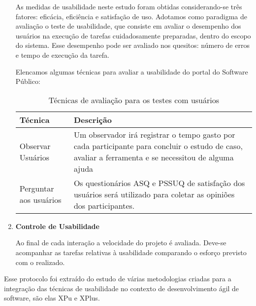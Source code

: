 \begin{enumerate}
	As medidas de usabilidade neste estudo foram obtidas considerando-se três fatores: eficácia, eficiência e satisfação de uso.
	Adotamos como paradigma de avaliação o teste de usabilidade, que consiste em avaliar o desempenho dos usuários na execução de tarefas cuidadosamente preparadas, dentro do escopo do sistema. Esse desempenho pode ser avaliado nos quesitos: número de erros e tempo de execução da tarefa. %

	Elencamos algumas técnicas para avaliar a usabilidade do portal do Software Público:

	\begin{table}[h]
	\begin{tabular}{|l| p{10cm}	|}
		\hline
		Técnica & Descrição \\ \hline
		Observar Usuários & Um observador irá registrar o tempo 
		gasto por cada participante para concluir o estudo de caso, 
		avaliar a ferramenta e se necessitou de alguma ajuda    \\ \hline
		Perguntar aos usuários & Os questionários ASQ e PSSUQ 
		de satisfação dos usuários será utilizado 
		para coletar as opiniões dos participantes.\\ \hline
	\end{tabular}
	\caption{Técnicas de avaliação para os testes com usuários}
	\end{table}
	
	\item \textbf{Controle de Usabilidade}
	
	Ao final de cada interação a velocidade do projeto é avaliada. Deve-se acompanhar as tarefas relativas à usabilidade comparando o esforço previsto com o realizado.
	
\end{enumerate}

Esse protocolo foi extraído do estudo de várias metodologias criadas para a integração das técnicas de usabilidade no contexto de desenvolvimento ágil de software, são elas XPu e XPlus.
 
 


